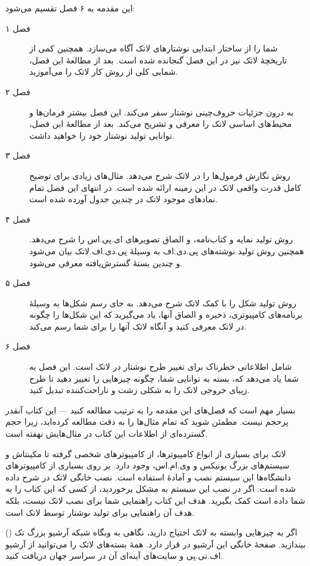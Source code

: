 \bigskip
\noindent 
این مقدمه به ۶ فصل تقسیم می‌شود:
\begin{description}
\item[فصل ۱] 
شما را از ساختار ابتدایی نوشتارهای لاتک آگاه می‌سازد. همچنین کمی از تاریخچهٔ لاتک نیز در این فصل گنجانده شده است. بعد از مطالعهٔ این فصل، شمایی کلی از روش کار لاتک را می‌آموزید.
\item[فصل ۲] 
به درون جزئیات حروف‌چینی نوشتار سفر می‌کند. این فصل بیشتر فرمان‌ها و محیط‌های اساسی لاتک را معرفی و تشریح می‌کند. بعد از مطالعهٔ این فصل، توانایی تولید نوشتار خود را خواهید داشت.
\item[فصل ۳]
روش نگارش فرمول‌ها را در لاتک شرح می‌دهد. مثال‌های زیادی برای توضیح کامل قدرت واقعی لاتک در این زمینه ارائه شده است. در انتهای این فصل تمام نمادهای موجود لاتک  در چندین جدول آورده شده است.
\item[فصل ۴] 
روش تولید نمایه و کتاب‌نامه، و الصاق تصویر‌های ای.پی.اس را شرح می‌دهد. همچنین روش تولید نوشته‌های پی.دی.اف به وسیلهٔ پی.دی.اف.لاتک بیان می‌شود و چندین بستهٔ گسترش‌یافته معرفی می‌شود. 
\item[فصل ۵] 
روش تولید شکل‌ را با کمک لاتک شرح می‌دهد. به جای رسم شکل‌ها به وسیلهٔ برنامه‌های کامپیوتری، ذخیره و الصاق آنها، یاد می‌گیرید که این شکل‌ها را چگونه در لاتک معرفی کنید و آنگاه لاتک آنها را برای شما رسم می‌کند.
\item[فصل ۶] 
شامل اطلاعاتی خطرناک برای تغییر طرح نوشتار در لاتک است. این فصل به شما یاد می‌دهد که، بسته به توانایی شما، چگونه چیز‌هایی را تغییر دهید تا طرح زیبای خروجی لاتک را به شکلی زشت و ناراحت‌کننده تبدیل کنید.
\end{description}
\bigskip
\noindent 
بسیار مهم است که فصل‌های این مقدمه را به ترتیب مطالعه کنید --- این کتاب آنقدر پرحجم نیست. مطمئن شوید که تمام مثال‌ها را به دقت مطالعه کرده‌اید، زیرا حجم گسترده‌ای از اطلاعات این کتاب در مثال‌هایش نهفته است.

\bigskip
\noindent 
لاتک برای بسیاری از انواع کامپیوترها، از کامپیوترهای شخصی گرفته تا مکینتاش و سیستم‌های بزرگ یونیکس و وی.ام.اس، وجود دارد. بر روی بسیاری از کامپیوترهای دانشگاه‌ها این سیستم نصب و آمادهٔ استفاده است. نصب خانگی لاتک در 
\guide
شرح داده شده است. اگر در نصب این سیستم به مشکل برخوردید، از کسی که این کتاب را به شما داده است کمک بگیرید. هدف این کتاب راهنمایی شما برای نصب لاتک نیست، بلکه هدف آن راهنمایی برای تولید نوشتار توسط لاتک است.

\bigskip
\noindent 
اگر به چیزهایی وابسته به لاتک احتیاج دارید، نگاهی به وبگاه شبکه آرشیو بزرگ تک 
()
بیندازید. صفحهٔ خانگی این آرشیو در 
قرار دارد. 
همهٔ بسته‌های لاتک را می‌توانید از آرشیو اف.تی.پی 
و سایت‌های آینه‌ای آن در سراسر جهان دریافت کنید.

